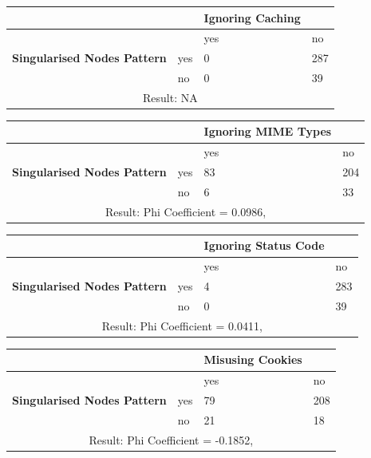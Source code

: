 \documentclass[a4paper,12pt]{article}
\begin{document}
\begin{center}
  \begin{tabular}{| p{60mm} | p{10mm} | p{35mm} | p{35mm} |}
  \hline
   & & \textbf{Ignoring Caching} &
  \\
  \hline
  & & yes & no
  \\
  \hline
  \textbf{Singularised Nodes Pattern} & yes & 0 & 287
  \\
  \hline
   & no & 0 & 39
  \\
  \hline
  \multicolumn{4}{|c|}{Result: NA}
  \\ \hline
  \end{tabular}
  \end{center}

\begin{center}
  \begin{tabular}{| p{60mm} | p{10mm} | p{35mm} | p{35mm} |}
  \hline
   & & \textbf{Ignoring MIME Types} &
  \\
  \hline
  & & yes & no
  \\
  \hline
  \textbf{Singularised Nodes Pattern} & yes & 83 & 204
  \\
  \hline
   & no & 6 & 33
  \\
  \hline
  \multicolumn{4}{|c|}{Result: Phi Coefficient = 0.0986, }
  \\ \hline
  \end{tabular}
  \end{center}

\begin{center}
  \begin{tabular}{| p{60mm} | p{10mm} | p{35mm} | p{35mm} |}
  \hline
   & & \textbf{Ignoring Status Code} &
  \\
  \hline
  & & yes & no
  \\
  \hline
  \textbf{Singularised Nodes Pattern} & yes & 4 & 283
  \\
  \hline
   & no & 0 & 39
  \\
  \hline
  \multicolumn{4}{|c|}{Result: Phi Coefficient = 0.0411, }
  \\ \hline
  \end{tabular}
  \end{center}

\begin{center}
  \begin{tabular}{| p{60mm} | p{10mm} | p{35mm} | p{35mm} |}
  \hline
   & & \textbf{Misusing Cookies} &
  \\
  \hline
  & & yes & no
  \\
  \hline
  \textbf{Singularised Nodes Pattern} & yes & 79 & 208
  \\
  \hline
   & no & 21 & 18
  \\
  \hline
  \multicolumn{4}{|c|}{Result: Phi Coefficient = -0.1852, }
  \\ \hline
  \end{tabular}
  \end{center}
\end{document}
